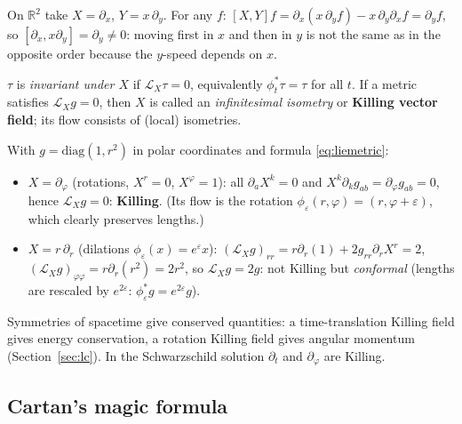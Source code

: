 \documentclass[11pt,a4paper]{article}
\numberwithin{equation}{section}
\theoremstyle{definition}
\theoremstyle{plain}
\newcommand{\R}{\mathbb{R}}
\newcommand{\Lie}{\mathcal{L}}
\begin{document}
\begin{example}
On $\R^2$ take $X=\partial_x$, $Y=x\,\partial_y$. For any $f$: $[X,Y]f=\partial_x(x\,\partial_yf)-x\,\partial_y\partial_xf=\partial_yf$, so $[\partial_x,x\partial_y]=\partial_y\neq0$: moving first in $x$ and then in $y$ is not the same as in the opposite order because the $y$-speed depends on $x$.
\end{example}

\begin{formal}
$\tau$ is \emph{invariant under $X$} if $\Lie_X\tau=0$, equivalently $\phi_t^*\tau=\tau$ for all $t$. If a metric satisfies $\Lie_Xg=0$, then $X$ is called an \emph{infinitesimal isometry} or \textbf{Killing vector field}; its flow consists of (local) isometries.
\end{formal}

\begin{example}
With $g=\mathrm{diag}(1,r^2)$ in polar coordinates and formula \eqref{eq:liemetric}:
\begin{itemize}[nosep]
\item $X=\partial_\varphi$ (rotations, $X^r=0$, $X^\varphi=1$): all $\partial_aX^k=0$ and $X^k\partial_kg_{ab}=\partial_\varphi g_{ab}=0$, hence $\Lie_Xg=0$: \textbf{Killing}. (Its flow is the rotation $\phi_\varepsilon(r,\varphi)=(r,\varphi+\varepsilon)$, which clearly preserves lengths.)
\item $X=r\,\partial_r$ (dilations $\phi_\varepsilon(x)=e^\varepsilon x$): $(\Lie_Xg)_{rr}=r\partial_r(1)+2g_{rr}\partial_rX^r=2$, $(\Lie_Xg)_{\varphi\varphi}=r\partial_r(r^2)=2r^2$, so $\Lie_Xg=2g$: not Killing but \emph{conformal} (lengths are rescaled by $e^{2\varepsilon}$: $\phi_\varepsilon^*g=e^{2\varepsilon}g$). \checkmark
\end{itemize}
\end{example}

\begin{intuition}
Symmetries of spacetime give conserved quantities: a time-translation Killing field gives energy conservation, a rotation Killing field gives angular momentum (Section~\ref{sec:lc}). In the Schwarzschild solution $\partial_t$ and $\partial_\varphi$ are Killing.
\end{intuition}


\subsection{Cartan's magic formula}\label{sec:cartan}
\end{document}
